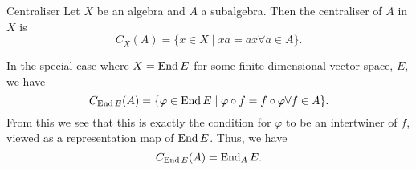 \begin{dfn}{Centraliser}{}
    Let \(X\) be an algebra and \(A\) a subalgebra.
    Then the centraliser of \(A\) in \(X\) is
    \begin{equation}
        C_X(A) = \{x \in X \mid xa = ax \forall a \in A\}.
    \end{equation}
\end{dfn}

In the special case where \(X = \operatorname{End} E\) for some finite-dimensional vector space, \(E\), we have
\begin{equation}
    C_{\operatorname{End} E}(A) = \{\varphi \in \operatorname{End} E \mid \varphi \circ f = f \circ \varphi \forall f \in A\}.
\end{equation}
From this we see that this is exactly the condition for \(\varphi\) to be an intertwiner of \(f\), viewed as a representation map of \(\operatorname{End} E\).
Thus, we have
\begin{equation}
    C_{\operatorname{End} E}(A) = \operatorname{End}_A E.
\end{equation}

